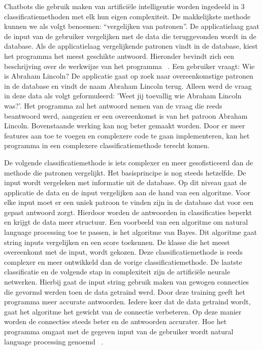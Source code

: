 Chatbots die gebruik maken van artificiële intelligentie worden ingedeeld in 3 classificatiemethoden met elk hun eigen complexiteit. De makkelijkste methode kunnen we als volgt benoemen: “vergelijken van patronen”. De applicatielaag gaat de input van de gebruiker vergelijken met de data die teruggevonden wordt in de database. Als de applicatielaag vergelijkende patronen vindt in de database, kiest het programma het meest geschikte antwoord. Hieronder bevindt  zich een beschrijving over de werkwijze van het programma ~\autocite{Techlabs2017}. \newline
Een gebruiker vraagt: Wie is Abraham Lincoln? De applicatie gaat op zoek naar overeenkomstige patronen in de database en vindt de naam Abraham Lincoln terug. Alleen werd de vraag in deze data als volgt geformuleerd: 'Weet jij toevallig wie Abraham Lincoln was?'. Het programma zal het antwoord nemen van de vraag die reeds beantwoord werd, aangezien er een overeenkomst is van het patroon Abraham Lincoln. 
Bovenstaande werking kan nog beter gemaakt worden. Door er meer features aan toe te voegen en complexere code te gaan implementeren, kan het programma in een complexere classificatiemethode terecht komen. \newline

De volgende classificatiemethode is iets complexer en meer gesofisticeerd dan de methode die patronen vergelijkt. Het basisprincipe is nog steeds hetzelfde. De input wordt vergeleken met informatie uit de database. Op dit niveau gaat de applicatie de data en de input vergelijken aan de hand van een algoritme. Voor elke input moet er een uniek patroon te vinden zijn in de database dat voor een gepast antwoord zorgt. 
Hierdoor worden de antwoorden in classificaties beperkt en krijgt de data meer structuur. Een voorbeeld van een algoritme om natural language processing toe te passen, is het algoritme van Bayes. Dit algoritme gaat string inputs vergelijken en een score toekennen. De klasse die het meest overeenkomt met de input, wordt gekozen. Deze classificatiemethode is reeds complexer en meer ontwikkeld dan de vorige classificatiemethode. \newline 
De laatste classificatie en de volgende stap in complexiteit zijn de artificiële neurale netwerken. Hierbij gaat de input string gebruik maken van gewogen connecties die gevormd werden toen de data getraind werd. Door deze training geeft het programma meer accurate antwoorden. Iedere keer dat de data getraind wordt, gaat het algoritme het gewicht van de connectie verbeteren. Op deze manier worden de connecties steeds beter en de antwoorden accurater. 
Hoe het programma omgaat met de gegeven input van de gebruiker wordt natural language processing genoemd ~\autocite{Techlabs2017}.

